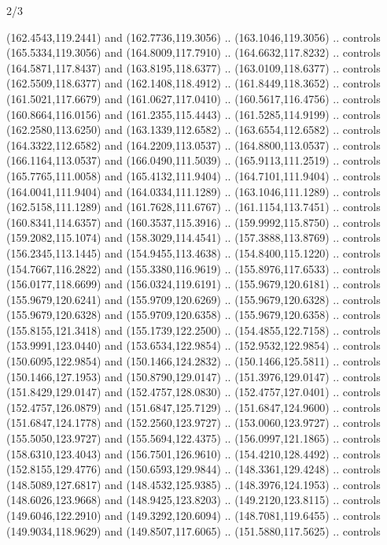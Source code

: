 \begin{flagdescription}{2/3}
\begin{scope}[xshift=0.5\flaglength,yshift=0.5\flagwidth,scale=\flagwidth/180]
\begin{scope}[y=0.8pt, x=0.8pt, yscale=-1,shift={(-168.75,-108.75)}]
  (162.4543,119.2441) and (162.7736,119.3056) .. (163.1046,119.3056) .. controls
  (165.5334,119.3056) and (164.8009,117.7910) .. (164.6632,117.8232) .. controls
  (164.5871,117.8437) and (163.8195,118.6377) .. (163.0109,118.6377) .. controls
  (162.5509,118.6377) and (162.1408,118.4912) .. (161.8449,118.3652) .. controls
  (161.5021,117.6679) and (161.0627,117.0410) .. (160.5617,116.4756) .. controls
  (160.8664,116.0156) and (161.2355,115.4443) .. (161.5285,114.9199) .. controls
  (162.2580,113.6250) and (163.1339,112.6582) .. (163.6554,112.6582) .. controls
  (164.3322,112.6582) and (164.2209,113.0537) .. (164.8800,113.0537) .. controls
  (166.1164,113.0537) and (166.0490,111.5039) .. (165.9113,111.2519) .. controls
  (165.7765,111.0058) and (165.4132,111.9404) .. (164.7101,111.9404) .. controls
  (164.0041,111.9404) and (164.0334,111.1289) .. (163.1046,111.1289) .. controls
  (162.5158,111.1289) and (161.7628,111.6767) .. (161.1154,113.7451) .. controls
  (160.8341,114.6357) and (160.3537,115.3916) .. (159.9992,115.8750) .. controls
  (159.2082,115.1074) and (158.3029,114.4541) .. (157.3888,113.8769) .. controls
  (156.2345,113.1445) and (154.9455,113.4638) .. (154.8400,115.1220) .. controls
  (154.7667,116.2822) and (155.3380,116.9619) .. (155.8976,117.6533) .. controls
  (156.0177,118.6699) and (156.0324,119.6191) .. (155.9679,120.6181) .. controls
  (155.9679,120.6241) and (155.9709,120.6269) .. (155.9679,120.6328) .. controls
  (155.9679,120.6328) and (155.9709,120.6358) .. (155.9679,120.6358) .. controls
  (155.8155,121.3418) and (155.1739,122.2500) .. (154.4855,122.7158) .. controls
  (153.9991,123.0440) and (153.6534,122.9854) .. (152.9532,122.9854) .. controls
  (150.6095,122.9854) and (150.1466,124.2832) .. (150.1466,125.5811) .. controls
  (150.1466,127.1953) and (150.8790,129.0147) .. (151.3976,129.0147) .. controls
  (151.8429,129.0147) and (152.4757,128.0830) .. (152.4757,127.0401) .. controls
  (152.4757,126.0879) and (151.6847,125.7129) .. (151.6847,124.9600) .. controls
  (151.6847,124.1778) and (152.2560,123.9727) .. (153.0060,123.9727) .. controls
  (155.5050,123.9727) and (155.5694,122.4375) .. (156.0997,121.1865) .. controls
  (158.6310,123.4043) and (156.7501,126.9610) .. (154.4210,128.4492) .. controls
  (152.8155,129.4776) and (150.6593,129.9844) .. (148.3361,129.4248) .. controls
  (148.5089,127.6817) and (148.4532,125.9385) .. (148.3976,124.1953) .. controls
  (148.6026,123.9668) and (148.9425,123.8203) .. (149.2120,123.8115) .. controls
  (149.6046,122.2910) and (149.3292,120.6094) .. (148.7081,119.6455) .. controls
  (149.9034,118.9629) and (149.8507,117.6065) .. (151.5880,117.5625) .. controls

\end{scope}
\end{scope}
\end{flagdescription}
